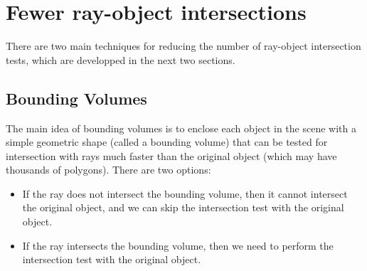 \section{Fewer ray-object intersections}

There are two main techniques for reducing the number of ray-object intersection tests, which are developped in the next two sections.

\subsection{Bounding Volumes}

The main idea of bounding volumes is to enclose each object in the scene with a simple geometric shape (called a bounding volume) that can be tested for intersection with rays much faster than the original object (which may have thousands of polygons). There are two options:
\begin{itemize}
    \item If the ray does not intersect the bounding volume, then it cannot intersect the original object, and we can skip the intersection test with the original object.
    \item If the ray intersects the bounding volume, then we need to perform the intersection test with the original object.
\end{itemize}

